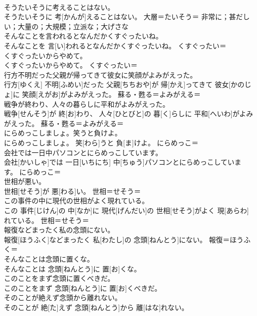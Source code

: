 \documentclass[8pt]{extreport}
\begin{document}
\begin{CJK}{UTF8}{min}
\\	そうたいそうに考えることはない。	
\\	そうたいそうに 考[かんが]えることはない。	大層＝たいそう＝ 非常に；甚だしい；大量の；大規模；立派な；大げさな
\\	そんなことを言われるとなんだかくすぐったいね。	
\\	そんなことを 言[い]われるとなんだかくすぐったいね。	くすぐったい＝ 
\\	くすぐったいからやめて。	
\\	くすぐったいからやめて。	くすぐったい＝ 
\\	行方不明だった父親が帰ってきて彼女に笑顔がよみがえった。	
\\	行方[ゆくえ] 不明[ふめい]だった 父親[ちちおや]が 帰[かえ]ってきて 彼女[かのじょ]に 笑顔[えがお]がよみがえった。	蘇る・甦る＝よみがえる＝ 
\\	戦争が終わり、人々の暮らしに平和がよみがえった。	
\\	戦争[せんそう]が 終[お]わり、 人々[ひとびと]の 暮[く]らしに 平和[へいわ]がよみがえった。	蘇る・甦る＝よみがえる＝ 
\\	にらめっこしましょ。笑うと負けよ。	
\\	にらめっこしましょ。 笑[わら]うと 負[ま]けよ。	にらめっこ＝ 
\\	会社では一日中パソコンとにらめっこしています。	
\\	会社[かいしゃ]では 一日[いちにち] 中[ちゅう]パソコンとにらめっこしています。	にらめっこ＝ 
\\	世相が悪い。	
\\	世相[せそう]が 悪[わる]い。	世相＝せそう＝ 
\\	この事件の中に現代の世相がよく現れている。	
\\	この 事件[じけん]の 中[なか]に 現代[げんだい]の 世相[せそう]がよく 現[あらわ]れている。	世相＝せそう＝ 
\\	報復などまったく私の念頭にない。	
\\	報復[ほうふく]などまったく 私[わたし]の 念頭[ねんとう]にない。	報復＝ほうふく＝ 
\\	そんなことは念頭に置くな。	
\\	そんなことは 念頭[ねんとう]に 置[お]くな。	
\\	このことをまず念頭に置くべきだ。	
\\	このことをまず 念頭[ねんとう]に 置[お]くべきだ。	
\\	そのことが絶えず念頭から離れない。	
\\	そのことが 絶[た]えず 念頭[ねんとう]から 離[はな]れない。	

\end{CJK}
\end{document}
